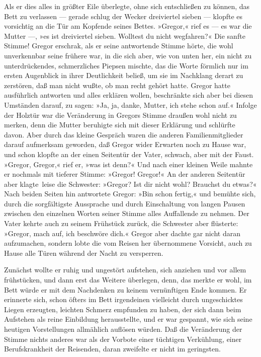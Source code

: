 Als er dies alles in größter Eile überlegte, ohne sich entschließen zu
können, das Bett zu verlassen --- gerade schlug der Wecker dreiviertel
sieben --- klopfte es vorsichtig an die Tür am Kopfende seines Bettes.
»Gregor,« rief es --- es war die Mutter ---, »es ist dreiviertel sieben.
Wolltest du nicht wegfahren?« Die sanfte Stimme! Gregor erschrak, als er
seine antwortende Stimme hörte, die wohl unverkennbar seine frühere war,
in die sich aber, wie von unten her, ein nicht zu unterdrückendes,
schmerzliches Piepsen mischte, das die Worte förmlich nur im ersten
Augenblick in ihrer Deutlichkeit beließ, um sie im Nachklang derart zu
zerstören, daß man nicht wußte, ob man recht gehört hatte. Gregor hatte
ausführlich antworten und alles erklären wollen, beschränkte sich aber
bei diesen Umständen darauf, zu sagen: »Ja, ja, danke, Mutter, ich stehe
schon auf.« Infolge der Holztür war die Veränderung in Gregors Stimme
draußen wohl nicht zu merken, denn die Mutter beruhigte sich mit dieser
Erklärung und schlürfte davon. Aber durch das kleine Gespräch waren die
anderen Familienmitglieder darauf aufmerksam geworden, daß Gregor wider
Erwarten noch zu Hause war, und schon klopfte an der einen Seitentür der
Vater, schwach, aber mit der Faust. »Gregor, Gregor,« rief er, »was ist
denn?« Und nach einer kleinen Weile mahnte er nochmals mit tieferer
Stimme: »Gregor! Gregor!« An der anderen Seitentür aber klagte\est\ leise die
Schwester: »Gregor? Ist dir nicht wohl? Brauchst du etwas?« Nach beiden
Seiten hin antwortete Gregor: »Bin schon fertig,« und bemühte sich,
durch die sorgfältigste Aussprache und durch Einschaltung von langen
Pausen zwischen den einzelnen Worten seiner Stimme alles Auffallende zu
nehmen. Der Vater kehrte auch zu seinem Frühstück zurück, die Schwester
aber flüsterte: »Gregor, mach auf, ich beschwöre dich.« Gregor aber
dachte gar nicht daran aufzumachen, sondern lobte die vom Reisen her
übernommene Vorsicht, auch zu Hause alle Türen während der Nacht zu
versperren.

Zunächst wollte er ruhig und ungestört aufstehen, sich anziehen und vor
allem frühstücken, und dann erst das Weitere überlegen, denn, das merkte
er wohl, im Bett würde er mit dem Nachdenken zu keinem vernünftigen Ende
kommen. Er erinnerte sich, schon öfters im Bett irgendeinen vielleicht
durch ungeschicktes Liegen erzeugten, leichten Schmerz empfunden zu
haben, der sich dann beim Aufstehen als reine Einbildung herausstellte,
und er war gespannt, wie sich seine heutigen Vorstellungen allmählich
auflösen würden. Daß die Veränderung der Stimme nichts anderes war als
der Vorbote einer tüchtigen Verkühlung, einer Berufskrankheit der
Reisenden, daran zweifelte er nicht im geringsten.

